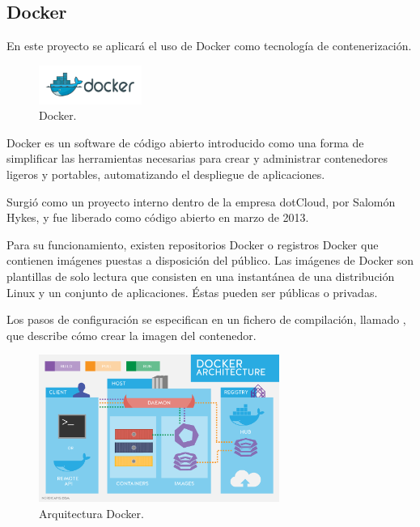 \subsection{Docker}

En este proyecto se aplicará el uso de Docker como tecnología de contenerización.

\begin{figure}[H]
\centering
\includegraphics[width=0.3\textwidth]{images/figures/docker.png}
\caption{Docker.\label{fig:figure_placement_example}}
\end{figure}

Docker es un software de código abierto introducido como una forma de simplificar las herramientas necesarias para crear y administrar contenedores ligeros y portables, automatizando el despliegue de aplicaciones.

Surgió como un proyecto interno dentro de la empresa dotCloud, por Salomón Hykes, y fue liberado como código abierto en marzo de 2013.

Para su funcionamiento, existen repositorios Docker o registros Docker que contienen imágenes puestas a disposición del público. Las imágenes de Docker son plantillas de solo lectura que consisten en una instantánea de una distribución Linux y un conjunto de aplicaciones. Éstas pueden ser públicas o privadas.

Los pasos de configuración se especifican en un fichero de compilación, llamado , que describe cómo crear la imagen del contenedor.

\begin{figure}[H]
\centering
\includegraphics[width=0.7\textwidth]{images/figures/dockerarchitecture.png}
\caption{Arquitectura Docker.\label{fig:figure_placement_example}}
\end{figure}

